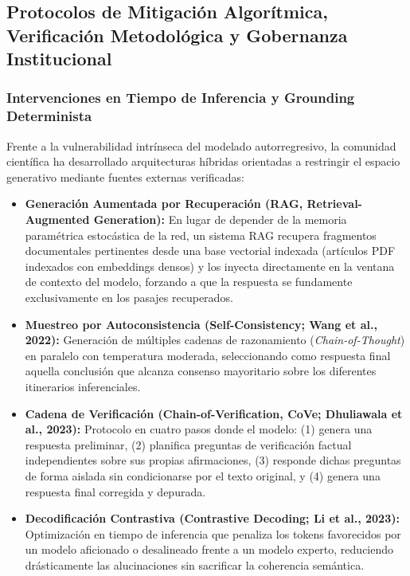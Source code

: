 \subsection{Protocolos de Mitigación Algorítmica, Verificación Metodológica y Gobernanza Institucional}


\vspace{0.4cm}

\subsubsection{Intervenciones en Tiempo de Inferencia y Grounding Determinista}

Frente a la vulnerabilidad intrínseca del modelado autorregresivo, la comunidad científica ha desarrollado arquitecturas híbridas orientadas a restringir el espacio generativo mediante fuentes externas verificadas:

\begin{itemize}
    \item \textbf{Generación Aumentada por Recuperación (RAG, Retrieval-Augmented Generation):} En lugar de depender de la memoria paramétrica estocástica de la red, un sistema RAG recupera fragmentos documentales pertinentes desde una base vectorial indexada (artículos PDF indexados con embeddings densos) y los inyecta directamente en la ventana de contexto del modelo, forzando a que la respuesta se fundamente exclusivamente en los pasajes recuperados.
    \item \textbf{Muestreo por Autoconsistencia (Self-Consistency; Wang et al., 2022):} Generación de múltiples cadenas de razonamiento (\textit{Chain-of-Thought}) en paralelo con temperatura moderada, seleccionando como respuesta final aquella conclusión que alcanza consenso mayoritario sobre los diferentes itinerarios inferenciales.
    \item \textbf{Cadena de Verificación (Chain-of-Verification, CoVe; Dhuliawala et al., 2023):} Protocolo en cuatro pasos donde el modelo: (1) genera una respuesta preliminar, (2) planifica preguntas de verificación factual independientes sobre sus propias afirmaciones, (3) responde dichas preguntas de forma aislada sin condicionarse por el texto original, y (4) genera una respuesta final corregida y depurada.
    \item \textbf{Decodificación Contrastiva (Contrastive Decoding; Li et al., 2023):} Optimización en tiempo de inferencia que penaliza los tokens favorecidos por un modelo aficionado o desalineado frente a un modelo experto, reduciendo drásticamente las alucinaciones sin sacrificar la coherencia semántica.
\end{itemize}

